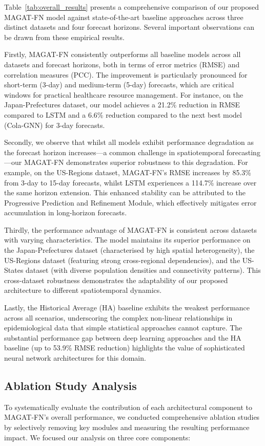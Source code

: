 \documentclass[lettersize, journal]{IEEEtran}
\begin{document}
Table~\ref{tab:overall_results} presents a comprehensive comparison of our proposed MAGAT-FN model against state-of-the-art baseline approaches across three distinct datasets and four forecast horizons. Several important observations can be drawn from these empirical results.

Firstly, MAGAT-FN consistently outperforms all baseline models across all datasets and forecast horizons, both in terms of error metrics (RMSE) and correlation measures (PCC). The improvement is particularly pronounced for short-term (3-day) and medium-term (5-day) forecasts, which are critical windows for practical healthcare resource management. For instance, on the Japan-Prefectures dataset, our model achieves a 21.2\% reduction in RMSE compared to LSTM and a 6.6\% reduction compared to the next best model (Cola-GNN) for 3-day forecasts.

Secondly, we observe that whilst all models exhibit performance degradation as the forecast horizon increases—a common challenge in spatiotemporal forecasting—our MAGAT-FN demonstrates superior robustness to this degradation. For example, on the US-Regions dataset, MAGAT-FN's RMSE increases by 85.3\% from 3-day to 15-day forecasts, whilst LSTM experiences a 114.7\% increase over the same horizon extension. This enhanced stability can be attributed to the Progressive Prediction and Refinement Module, which effectively mitigates error accumulation in long-horizon forecasts.

Thirdly, the performance advantage of MAGAT-FN is consistent across datasets with varying characteristics. The model maintains its superior performance on the Japan-Prefectures dataset (characterised by high spatial heterogeneity), the US-Regions dataset (featuring strong cross-regional dependencies), and the US-States dataset (with diverse population densities and connectivity patterns). This cross-dataset robustness demonstrates the adaptability of our proposed architecture to different spatiotemporal dynamics.

Lastly, the Historical Average (HA) baseline exhibits the weakest performance across all scenarios, underscoring the complex non-linear relationships in epidemiological data that simple statistical approaches cannot capture. The substantial performance gap between deep learning approaches and the HA baseline (up to 53.9\% RMSE reduction) highlights the value of sophisticated neural network architectures for this domain.

\subsection{Ablation Study Analysis}
To systematically evaluate the contribution of each architectural component to MAGAT-FN's overall performance, we conducted comprehensive ablation studies by selectively removing key modules and measuring the resulting performance impact. We focused our analysis on three core components:
\end{document}
